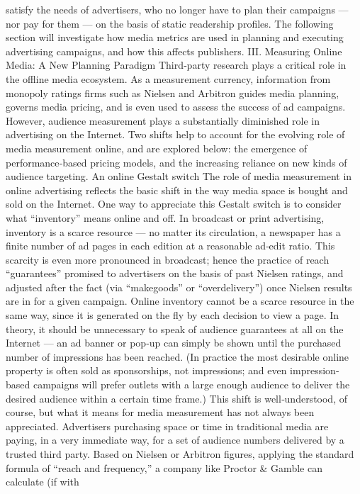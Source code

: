 satisfy the needs of advertisers, who no longer have to plan their
campaigns — nor pay for them — on the basis of static readership
profiles. The following section will investigate how media metrics are
used in planning and executing advertising campaigns, and how this
affects publishers.
III. Measuring Online Media: A New Planning Paradigm
Third‐party research plays a critical role in the offline media ecosystem.
As a measurement currency, information from monopoly ratings firms
such as Nielsen and Arbitron guides media planning, governs media
pricing, and is even used to assess the success of ad campaigns. However,
audience measurement plays a substantially diminished role in
advertising on the Internet. Two shifts help to account for the evolving
role of media measurement online, and are explored below: the
emergence of performance‐based pricing models, and the increasing
reliance on new kinds of audience targeting.
An online Gestalt switch
The role of media measurement in online advertising reflects the basic
shift in the way media space is bought and sold on the Internet. One way
to appreciate this Gestalt switch is to consider what ``inventory'' means
online and off. In broadcast or print advertising, inventory is a scarce
resource — no matter its circulation, a newspaper has a finite number of
ad pages in each edition at a reasonable ad‐edit ratio. This scarcity is even
more pronounced in broadcast; hence the practice of reach ``guarantees''
promised to advertisers on the basis of past Nielsen ratings, and adjusted
after the fact (via ``makegoods'' or ``overdelivery'') once Nielsen results are
in for a given campaign.
Online inventory cannot be a scarce resource in the same way, since it is
generated on the fly by each decision to view a page. In theory, it should
be unnecessary to speak of audience guarantees at all on the Internet — an
ad banner or pop‐up can simply be shown until the purchased number of
impressions has been reached. (In practice the most desirable online
property is often sold as sponsorships, not impressions; and even
impression‐based campaigns will prefer outlets with a large enough
audience to deliver the desired audience within a certain time frame.)
This shift is well‐understood, of course, but what it means for media
measurement has not always been appreciated. Advertisers purchasing
space or time in traditional media are paying, in a very immediate way,
for a set of audience numbers delivered by a trusted third party. Based on
Nielsen or Arbitron figures, applying the standard formula of ``reach and
frequency,'' a company like Proctor & Gamble can calculate (if with
